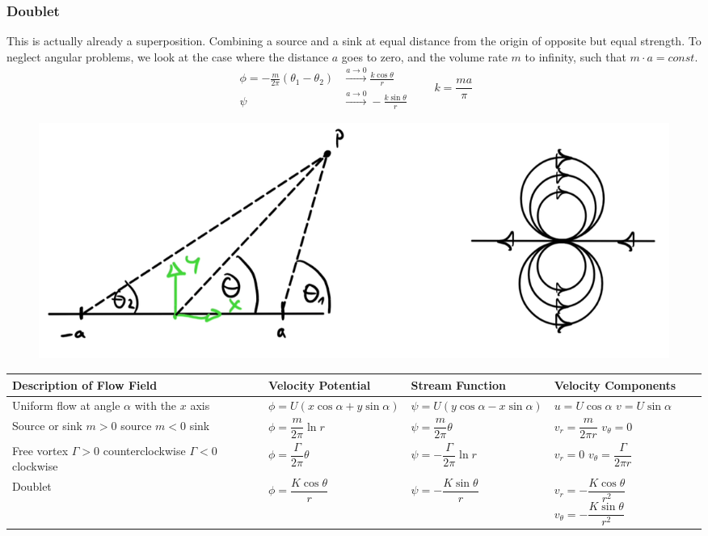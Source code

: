 \subsubsection{Doublet}
This is actually already a superposition. Combining a source and a sink at equal distance from the origin of opposite but equal strength. To neglect angular problems, we look at the case where the distance $a$ goes to zero, and the volume rate $m$ to infinity, such that $m\cdot a = const$.
\begin{equation*}
	\begin{split}
		\phi = -\frac{m}{2\pi}(\theta_1-\theta_2) &\stackrel{a\to 0}{\longrightarrow}\frac{k\cos\theta}r\\
	\psi &\stackrel{a\to 0}{\longrightarrow} -\frac{k\sin\theta}{r}
	\end{split}\qquad k = \frac{ma}{\pi}
\end{equation*}

\begin{figure}[H]
	\centering
	\includegraphics[width=0.4\linewidth]{Sketches/doublet_flow}
	\caption{}
	\label{fig:doubletflow}
\end{figure}
\begin{tabular}{|m{2cm}|l|l|m{4cm}|}
	\hline
	\textbf{Description of Flow Field} & \textbf{Velocity Potential} & \textbf{Stream Function} & \textbf{Velocity Components} \\
	\hline
	Uniform flow at angle $\alpha$ with the $x$ axis &
	$\phi = U(x \cos \alpha + y \sin \alpha)$ &
	$\psi = U(y \cos \alpha - x \sin \alpha)$ &
	$u = U \cos \alpha$ \newline $v = U \sin \alpha$ \\
	\hline
	Source or sink \newline $m > 0$ source \newline $m < 0$ sink &
	$\phi = \dfrac{m}{2\pi} \ln r$ &
	$\psi = \dfrac{m}{2\pi} \theta$ &
	$v_r = \dfrac{m}{2\pi r}$ \newline $v_\theta = 0$ \\
	\hline
	Free vortex \newline $\Gamma > 0$ counterclockwise \newline $\Gamma < 0$ clockwise &
	$\phi = \dfrac{\Gamma}{2\pi} \theta$ &
	$\psi = -\dfrac{\Gamma}{2\pi} \ln r$ &
	$v_r = 0$ \newline $v_\theta = \dfrac{\Gamma}{2\pi r}$ \\
	\hline
	Doublet &
	$\phi = \dfrac{K \cos \theta}{r}$ &
	$\psi = -\dfrac{K \sin \theta}{r}$ &
	$v_r = -\dfrac{K \cos \theta}{r^2}$ \newline $v_\theta = -\dfrac{K \sin \theta}{r^2}$ \\
	\hline
\end{tabular}
